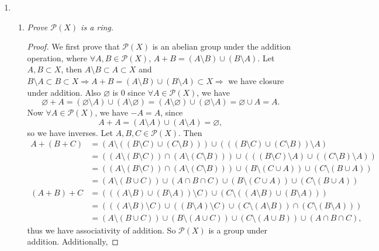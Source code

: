 \documentclass[10pt,oneside,reqno]{amsart}
\theoremstyle{plain}
\theoremstyle{definition}
\begin{document}
\begin{enumerate}
\item[]
\begin{enumerate}
\item \textit{Prove $\mathcal{P}(X)$ is a ring.  }

\begin{proof}
We first prove that $\mathcal{P}(X)$ is an abelian group under the addition operation, where $\forall A,B \in \mathcal{P}(X)$, $A + B = (A \setminus B) \cup (B \setminus A)$. Let $A,B \subset X$, then $A \setminus B \subset A \subset X$ and $B \setminus A \subset B \subset X \Rightarrow A + B = (A \setminus B) \cup (B \setminus A) \subset X \Rightarrow$ we have closure under addition. Also $\varnothing$ is $0$ since $\forall A \in \mathcal{P}(X)$, we have \[\varnothing  + A = (\varnothing \setminus A) \cup (A \setminus \varnothing) = (A \setminus \varnothing)\cup(\varnothing \setminus A)  =  \varnothing \cup A = A.\]
Now $\forall A \in \mathcal{P}(X)$, we have $-A = A$, since 
\[A + A = (A \setminus A) \cup (A \setminus A) = \varnothing,\]
so we have inverses. Let $A,B,C \in \mathcal{P}(X)$. Then
\begin{equation}
\begin{aligned}
A + (B + C) &= (A \setminus ((B \setminus C) \cup (C \setminus B))) \cup (((B \setminus C) \cup (C \setminus B)) \setminus A)\\
&= ((A \setminus (B \setminus C)) \cap (A \setminus (C \setminus B))) \cup (((B \setminus C) \setminus A) \cup ((C \setminus B) \setminus A))\\
&= ((A \setminus (B \setminus C)) \cap (A \setminus (C \setminus B)))  \cup (B \setminus (C \cup A)) \cup (C \setminus (B \cup A))\\
&=(A \setminus (B \cup C)) \cup (A \cap B \cap C) \cup (B \setminus (C \cup A)) \cup (C \setminus (B \cup A))\\
(A + B) + C &= (((A \setminus B) \cup (B \setminus A))\setminus C) \cup (C \setminus ((A \setminus B) \cup (B \setminus A)))\\
&= (((A \setminus B) \setminus C) \cup ((B \setminus A) \setminus C) \cup (C \setminus(A \setminus B)) \cap (C \setminus (B \setminus A)))\\
&= (A \setminus (B \cup C)) \cup (B \setminus (A \cup C)) \cup (C \setminus (A \cup B)) \cup (A \cap B \cap C),
\end{aligned}
\end{equation}
thus we have associativity of addition. So $\mathcal{P}(X)$ is a group under addition. Additionally, 

\end{proof}
\end{enumerate}
\end{enumerate}
\end{document}
